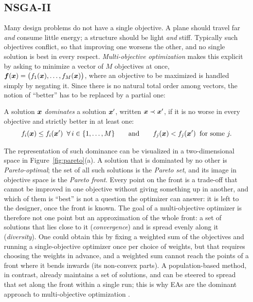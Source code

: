 \subsection{NSGA-II}
\label{subsec:nsga2}

Many design problems do not have a single objective. A plane should travel far \emph{and} consume little energy; a structure should be light \emph{and} stiff. Typically such objectives conflict, so that improving one worsens the other, and no single solution is best in every respect. \emph{Multi-objective optimization} \cite{miettinen1998nonlinear, deb2001multi} makes this explicit by asking to minimize a vector of $M$ objectives at once, $\bm{f}(\bm{x}) = \big(f_1(\bm{x}), \dots, f_M(\bm{x})\big)$, where an objective to be maximized is handled simply by negating it. Since there is no natural total order among vectors, the notion of ``better'' has to be replaced by a partial one:

\begin{definition}
A solution $\bm{x}$ \emph{dominates} a solution $\bm{x}'$, written $\bm{x} \prec \bm{x}'$, if it is no worse in every objective and strictly better in at least one:
\begin{equation}
f_i(\bm{x}) \le f_i(\bm{x}') \;\; \forall\, i \in \{1,\dots,M\} \qquad \text{and} \qquad f_j(\bm{x}) < f_j(\bm{x}') \;\; \text{for some } j.
\end{equation}
\end{definition}

The representation of such dominance can be visualized in a two-dimensional space in Figure~\ref{fig:pareto}(a). A solution that is dominated by no other is \emph{Pareto-optimal}; the set of all such solutions is the \emph{Pareto set}, and its image in objective space is the \emph{Pareto front}. Every point on the front is a trade-off that cannot be improved in one objective without giving something up in another, and which of them is ``best'' is not a question the optimizer can answer: it is left to the designer, once the front is known. The goal of a multi-objective optimizer is therefore not one point but an approximation of the whole front: a set of solutions that lies close to it (\emph{convergence}) and is spread evenly along it (\emph{diversity}). One could obtain this by fixing a weighted sum of the objectives and running a single-objective optimizer once per choice of weights, but that requires choosing the weights in advance, and a weighted sum cannot reach the points of a front where it bends inwards (its non-convex parts). A population-based method, in contrast, already maintains a set of solutions, and can be steered to spread that set along the front within a single run; this is why EAs are the dominant approach to multi-objective optimization \cite{deb2001multi}.

